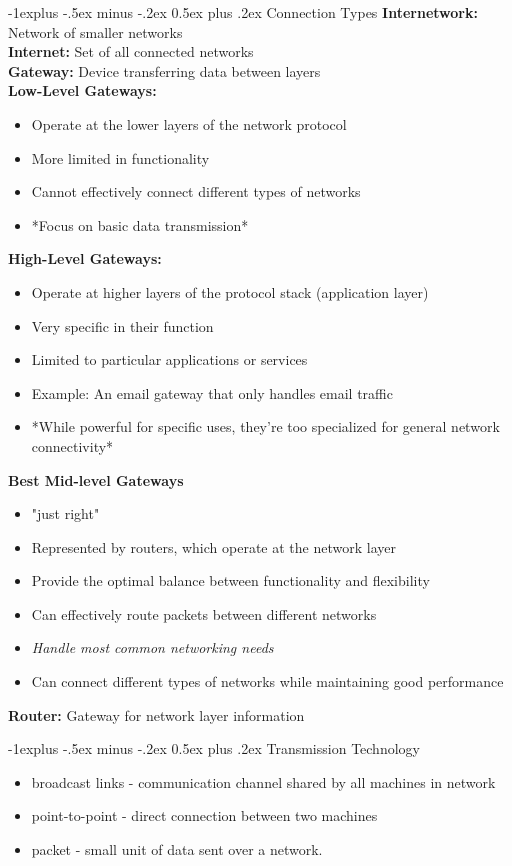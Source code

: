 \documentclass[letterpaper, 8pt]{extarticle}
\makeatletter
\renewcommand{\subsection}{\@startsection{subsection}{2}{0mm}%
                                {-1explus -.5ex minus -.2ex}%
                                {0.5ex plus .2ex}%
                                {\normalfont\small\bfseries}}
\makeatother
\begin{document}
\begin{multicols*}{4}
	\subsection{Connection Types}
	\textbf{Internetwork:} Network of smaller networks \\
	\textbf{Internet:} Set of all connected networks \\
	\textbf{Gateway:} Device transferring data between layers \\
	\textbf{Low-Level Gateways:}
	\begin{itemize}
		\item Operate at the lower layers of the network protocol
		\item More limited in functionality
		\item Cannot effectively connect different types of networks
		\item *Focus on basic data transmission*
	\end{itemize}
	\textbf{High-Level Gateways:}
	\begin{itemize}
		\item Operate at higher layers of the protocol stack (application layer)
		\item Very specific in their function
		\item Limited to particular applications or services
		\item Example: An email gateway that only handles email traffic
		\item *While powerful for specific uses, they're too specialized for general network connectivity*
	\end{itemize}
	\textbf{Best Mid-level Gateways}
	\begin{itemize}
		\item "just right"
		\item Represented by routers, which operate at the network layer
		\item Provide the optimal balance between functionality and flexibility
		\item Can effectively route packets between different networks
		\item \textit{Handle most common networking needs}
		\item Can connect different types of networks while maintaining good performance
	\end{itemize}
	\textbf{Router:} Gateway for network layer information

	\subsection{Transmission Technology}
	\begin{itemize}
		\item broadcast links - communication channel shared by all machines in network
		\item point-to-point - direct connection between two machines
		\item packet - small unit of data sent over a network.
	\end{itemize}


\end{multicols*}
\end{document}
